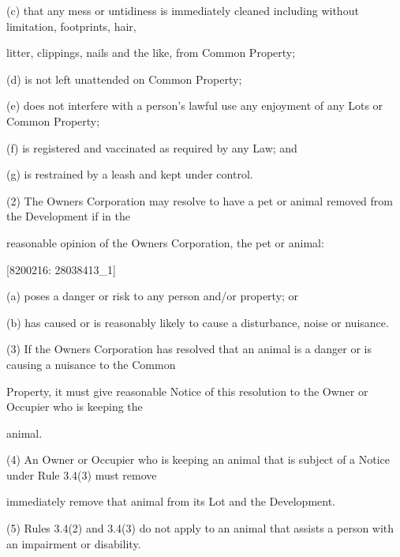 \documentclass{article}
\begin{document}
{\fontsize{9.962}{1}(c) that any mess or untidiness is immediately cleaned including without limitation, footprints, hair, }

{\fontsize{10.02}{1}litter, clippings, nails and the like,  from Common Property; }

{\fontsize{9.962}{1}(d) is not left unattended on Common Property; }

{\fontsize{9.962}{1}(e) does not interfere with a person’s lawful use any enjoyment of any Lots or Common Property; }

{\fontsize{9.962}{1}(f) is registered and vaccinated as required by any Law; and }

{\fontsize{9.962}{1}(g) is restrained by a leash and kept under control. }

{\fontsize{9.962}{1}(2) The Owners Corporation may resolve to have a pet or animal removed from the Development if in the }

{\fontsize{10.02}{1}reasonable opinion of the Owners Corporation, the pet or animal: }

\newpage
















{\fontsize{7.02}{1}[8200216: 28038413\_1] }


{\fontsize{9.962}{1}(a) poses a danger or risk to any person and/or property; or }

{\fontsize{9.962}{1}(b) has caused or is reasonably likely to cause a disturbance, noise or nuisance. }

{\fontsize{9.962}{1}(3) If the Owners Corporation has resolved that an animal is a danger or is causing a nuisance to the Common }

{\fontsize{10.02}{1}Property, it must give reasonable Notice of this resolution to the Owner or Occupier who is keeping the }

{\fontsize{10.02}{1}animal. }

{\fontsize{9.962}{1}(4) An Owner or Occupier who is keeping an animal that is subject of a Notice under Rule 3.4(3) must remove }

{\fontsize{10.02}{1}immediately remove that animal from its Lot and the Development. }

{\fontsize{9.962}{1}(5) Rules 3.4(2) and 3.4(3) do not apply to an animal that assists a person with an impairment or disability. }
\end{document}
